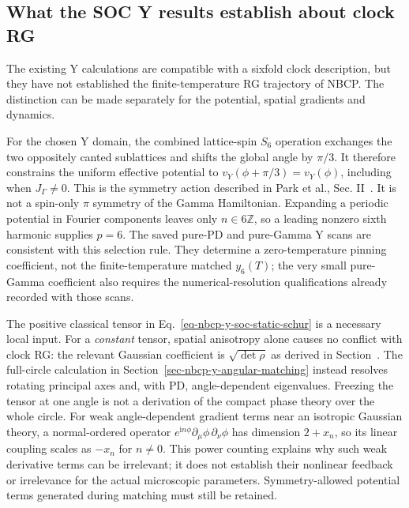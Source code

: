 \subsection{What the SOC Y results establish about clock
RG}\label{sec-nbcp-y-rg-status}

The existing Y calculations are compatible with a sixfold clock
description, but they have not established the finite-temperature RG
trajectory of NBCP. The distinction can be made separately for the
potential, spatial gradients and dynamics.

For the chosen Y domain, the combined lattice-spin \(S_6\) operation
exchanges the two oppositely canted sublattices and shifts the global
angle by \(\pi/3\). It therefore constrains the uniform effective
potential to \(v_Y(\phi+\pi/3)=v_Y(\phi)\), including when
\(J_\Gamma\ne0\). This is the symmetry action described in
Park et al., Sec. II~\cite{park2026}. It is
not a spin-only \(\pi\) symmetry of the Gamma Hamiltonian. Expanding a
periodic potential in Fourier components leaves only \(n\in6\mathbb Z\),
so a leading nonzero sixth harmonic supplies \(p=6\). The saved pure-PD
and pure-Gamma Y scans are consistent with this selection rule. They
determine a zero-temperature pinning coefficient, not the
finite-temperature matched \(y_6(T)\); the very small pure-Gamma
coefficient also requires the numerical-resolution qualifications
already recorded with those scans.

The positive classical tensor in Eq.~\ref{eq-nbcp-y-soc-static-schur} is
a necessary local input. For a \emph{constant} tensor, spatial
anisotropy alone causes no conflict with clock RG: the relevant Gaussian
coefficient is \(\sqrt{\det\rho}\) as derived in
Section~. The full-circle calculation in
Section~\ref{sec-nbcp-y-angular-matching} instead resolves rotating
principal axes and, with PD, angle-dependent eigenvalues. Freezing the
tensor at one angle is not a derivation of the compact phase theory over
the whole circle. For weak angle-dependent gradient terms near an
isotropic Gaussian theory, a normal-ordered operator
\(e^{\mathrm in\phi}\partial_\mu\phi\,\partial_\nu\phi\) has dimension
\(2+x_n\), so its linear coupling scales as \(-x_n\) for \(n\ne0\). This
power counting explains why such weak derivative terms can be
irrelevant; it does not establish their nonlinear feedback or
irrelevance for the actual microscopic parameters. Symmetry-allowed
potential terms generated during matching must still be retained.

